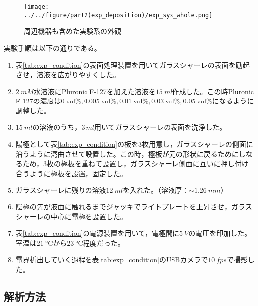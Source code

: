 \documentclass[autodetect-engine,dvi=dvipdfmx,a4paper,ja=standard,oneside,openany,11pt,draft]{bxjsbook}
\begin{document}
\begin{figure}[htbp]
  \centering
  \texttt{[image: ../../figure/part2(exp\_deposition)/exp\_sys\_whole.png]}
  \caption{周辺機器も含めた実験系の外観}
  \label{fig:system_exp_whole}
\end{figure}
実験手順は以下の通りである。

\begin{enumerate}
  \item 表\ref{tab:exp_condition}の表面処理装置を用いてガラスシャーレの表面を励起させ，溶液を広がりやすくした。
  \item {} $\SI{2}{mM}$水溶液にPluronic F-127を加えた溶液を$\SI{15}{ml}$作成した。この時Pluronic F-127の濃度は$\SI{0}{\mathrm{vol}\%}, \SI{0.005}{\mathrm{vol}\%}, \SI{0.01}{\mathrm{vol}\%}, \SI{0.03}{\mathrm{vol}\%}, \SI{0.05}{\mathrm{vol}\%}$になるように調整した。
  \item $\SI{15}{ml}$の溶液のうち，$\SI{3}{ml}$用いてガラスシャーレの表面を洗浄した。
  \item 陽極として表\ref{tab:exp_condition}の板を3枚用意し，ガラスシャーレの側面に沿うように湾曲させて設置した。この時，極板が元の形状に戻るためにしなるため，3枚の極板を重ねて設置し，ガラスシャーレ側面に互いに押し付け合うように極板を設置，固定した。
  \item ガラスシャーレに残りの溶液$\SI{12}{ml}$を入れた。（溶液厚：$\sim\SI{1.26}{mm}$）
  \item 陰極の先が液面に触れるまでジャッキでライトプレートを上昇させ，ガラスシャーレの中心に電極を設置した。
  \item 表\ref{tab:exp_condition}の電源装置を用いて，電極間に$\SI{5}{V}$の電圧を印加した。室温は$\SI{21}{\degreeCelsius}$から$\SI{23}{\degreeCelsius}$程度だった。
  \item 電界析出していく過程を表\ref{tab:exp_condition}のUSBカメラで$\SI{10}{fps}$で撮影した。
\end{enumerate}

\subsection{解析方法}
\end{document}
